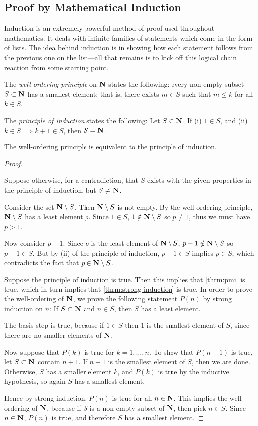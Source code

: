 \subsection{Proof by Mathematical Induction}
Induction is an extremely powerful method of proof used throughout mathematics. It deals with infinite families of statements which come in the form of lists. The idea behind induction is in showing how each statement follows from the previous one on the list---all that remains is to kick off this logical chain reaction from some starting point.

The \emph{well-ordering principle} on $\mathbf N$ states the following: every non-empty subset $S\subset\mathbf N$ has a smallest element; that is, there exists $m\in S$ such that $m\le k$ for all $k\in S$.

The \emph{principle of induction} states the following: Let $S\subset\mathbf N$. If (i) $1\in S$, and (ii) $k\in S\implies k+1\in S$, then $S=\mathbf N$.

\begin{lemma}\label{lemma:wop-poi}
The well-ordering principle is equivalent to the principle of induction.
\end{lemma}

\begin{proof} \

\fbox{$\implies$} Suppose otherwise, for a contradiction, that $S$ exists with the given properties in the principle of induction, but $S\neq\mathbf N$. 

Consider the set $\mathbf N\setminus S$. Then $\mathbf N\setminus S$ is not empty. By the well-ordering principle, $\mathbf N\setminus S$ has a least element $p$. Since $1\in S$, $1\notin \mathbf N\setminus S$ so $p\neq 1$, thus we must have $p>1$. 

Now consider $p-1$. Since $p$ is the least element of $\mathbf N\setminus S$, $p-1\notin \mathbf N\setminus S$ so $p-1\in S$. But by (ii) of the principle of induction, $p-1\in S$ implies $p\in S$, which contradicts the fact that $p\in\mathbf N\setminus S$.

\fbox{$\impliedby$} Suppose the principle of induction is true. Then this implies that \cref{thrm:pmi} is true, which in turn implies that \cref{thrm:strong-induction} is true. In order to prove the well-ordering of $\mathbf N$, we prove the following statement $P(n)$ by strong induction on $n$: If $S\subset\mathbf N$ and $n\in S$, then $S$ has a least element.

The basis step is true, because if $1\in S$ then $1$ is the smallest element of $S$, since there are no smaller elements of $\mathbf N$.

Now suppose that $P(k)$ is true for $k=1,\dots,n$. To show that $P(n+1)$ is true, let $S\subset\mathbf N$ contain $n+1$. If $n+1$ is the smallest element of $S$, then we are done. Otherwise, $S$ has a smaller element $k$, and $P(k)$ is true by the inductive hypothesis, so again $S$ has a smallest element.

Hence by strong induction, $P(n)$ is true for all $n\in\mathbf N$. This implies the well-ordering of $\mathbf N$, because if $S$ is a non-empty subset of $\mathbf N$, then pick $n\in S$. Since $n\in\mathbf N$, $P(n)$ is true, and therefore $S$ has a smallest element.
\end{proof}

